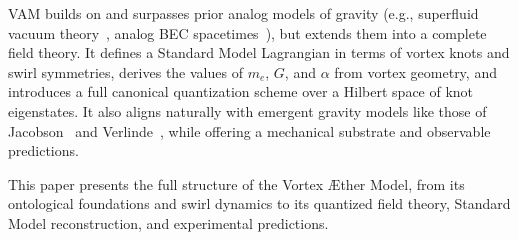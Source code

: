     VAM builds on and surpasses prior analog models of gravity (e.g., superfluid vacuum theory~\cite{barcelo2011analogue}, analog BEC spacetimes~\cite{volovik2003universe}), but extends them into a complete field theory. It defines a Standard Model Lagrangian in terms of vortex knots and swirl symmetries, derives the values of $m_e$, $G$, and $\alpha$ from vortex geometry, and introduces a full canonical quantization scheme over a Hilbert space of knot eigenstates. It also aligns naturally with emergent gravity models like those of Jacobson~\cite{jacobson1995thermo} and Verlinde~\cite{verlinde2011emergent}, while offering a mechanical substrate and observable predictions.

    This paper presents the full structure of the Vortex \AE ther Model, from its ontological foundations and swirl dynamics to its quantized field theory, Standard Model reconstruction, and experimental predictions.

